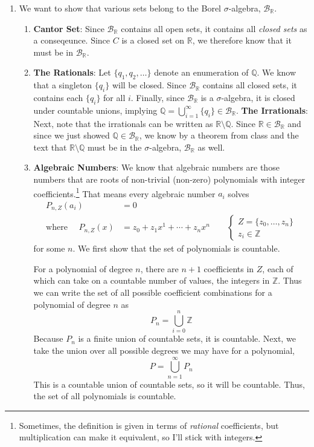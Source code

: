 \documentclass[12pt]{article}
\theoremstyle{plain}
\theoremstyle{definition}
\theoremstyle{remark}
\begin{document}
\begin{enumerate}
\newpage
\item We want to show that various sets belong to the Borel $\sigma$-algebra, $\mathscr{B}_\mathbb{R}$.
\begin{enumerate} 
    \item \textbf{Cantor Set}: Since $\mathscr{B}_\mathbb{R}$ contains all open sets, it contains all \emph{closed sets} as a conseqeunce. Since $C$ is a closed set on $\mathbb{R}$, we therefore know that it must be in $\mathscr{B}_\mathbb{R}$.
    \item \textbf{The Rationals}: Let $\{q_1, q_2, \ldots\}$ denote an enumeration of $\mathbb{Q}$. We know that a singleton $\{q_i\}$ will be closed. Since $\mathscr{B}_\mathbb{R}$ contains all closed sets, it contains each $\{q_i\}$ for all $i$. Finally, since $\mathscr{B}_\mathbb{R}$ is a $\sigma$-algebra, it is closed under countable unions, implying $\mathbb{Q} = \bigcup^\infty_{i=1} \{q_i\} \in \mathscr{B}_\mathbb{R}$.  
\textbf{The Irrationals}: Next, note that the irrationals can be written as $\mathbb{R}\setminus \mathbb{Q}$. Since $\mathbb{R}\in\mathscr{B}_\mathbb{R}$ and since we just showed $\mathbb{Q}\in\mathscr{B}_\mathbb{R}$, we know by a theorem from class and the text that $\mathbb{R}\setminus \mathbb{Q}$ must be in the $\sigma$-algebra, $\mathscr{B}_\mathbb{R}$ as well.

\item \textbf{Algebraic Numbers}: We know that algebraic numbers are those numbers that are roots of non-trivial (non-zero) polynomials with integer coefficients.\footnote{Sometimes, the definition is given in terms of \emph{rational} coefficients, but multiplication can make it equivalent, so I'll stick with integers.} That means every algebraic number $a_i$ solves
\begin{align*}
    P_{n, Z}(a_i) &= 0 \\
    \text{where } \quad P_{n,Z}(x) &= z_0 + z_1 x^1 + \cdots 
    + z_n x^n
    \qquad 
    \begin{cases}
        Z = \{z_0, \ldots, z_n\} \\
        z_i\in\mathbb{Z}
    \end{cases}
\end{align*}
for some $n$. We first show that the set of polynomials is countable.

For a polynomial of degree $n$, there are $n+1$ coefficients in ${Z}$, each of which can take on a countable number of values, the integers in $\mathbb{Z}$. Thus we can write the set of all possible coefficient combinations for a polynomial of degree $n$ as 
\[
    P_n = \bigcup^{n}_{i=0} \mathbb{Z}
\]
Because $P_n$ is a finite union of countable sets, it is countable. Next, we take the union over all possible degrees we may have for a polynomial,
\begin{equation}
    \label{q9}
    P = \bigcup_{n=1}^\infty P_n
\end{equation}
This is a countable union of countable sets, so it will be countable. Thus, the set of all polynomials is countable.


\end{enumerate}
\end{enumerate}
\end{document}
